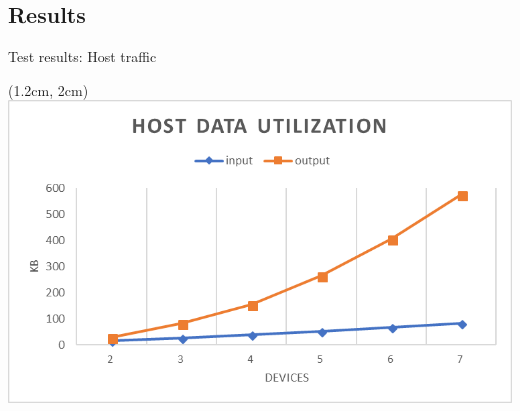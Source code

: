 \subsection{Results}
\begin{frame}{Test results: Host traffic}
	
  \begin{textblock*}{5cm}(1.2cm, 2cm)
  	\includegraphics[scale=0.80]{../report/res/img/host_data_utilization}
  \end{textblock*}
  
\end{frame}

